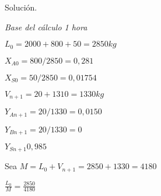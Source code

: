\documentclass[12pt,openany]{book}
\begin{document}
Solución.

\textit{Base del cálculo 1 hora}

$L_0=2000+800+50 = 2850kg$

$X_{A0}=800/2850=0,281$

$X_{S0}=50/2850=0,01754$

$V_{n+1}=20+1310=1330 kg$

$Y_{A n+1}=20/1330=0,0150$

$Y_{B n+1}=20/1330=0$

$Y_{S n+1}0,985$

Sea $M = L_0+V_{n+1}=2850+1330 =4180$

$\frac{L_0}{M} = \frac{2850}{4180}$
\end{document}
